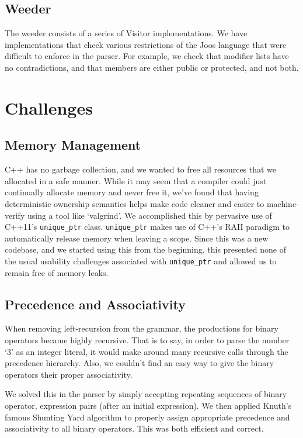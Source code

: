 \documentclass[12pt, titlepage]{article}
\begin{document}
\subsection{Weeder}
The weeder consists of a series of Visitor implementations. We have
implementations that check various restrictions of the Joos language that were
difficult to enforce in the parser. For example, we check that modifier lists
have no contradictions, and that members are either public or protected, and
not both.

\newpage

\section{Challenges}
\subsection{Memory Management}
C++ has no garbage collection, and we wanted to free all resources that we
allocated in a safe manner. While it may seem that a compiler could just
continually allocate memory and never free it, we've found that having
deterministic ownership semantics helps make code cleaner and easier to
machine-verify using a tool like `valgrind'. We accomplished this by pervasive
use of C++11's \verb+unique_ptr+ class. \verb+unique_ptr+ makes use of C++'s
RAII paradigm to automatically release memory when leaving a scope. Since this
was a new codebase, and we started using this from the beginning, this
presented none of the usual usability challenges associated with
\verb+unique_ptr+ and allowed us to remain free of memory leaks.

\subsection{Precedence and Associativity}
When removing left-recursion from the grammar, the productions for binary
operators became highly recursive. That is to say, in order to parse the number
`3' as an integer literal, it would make around many recursive calls through
the precedence hierarchy. Also, we couldn't find an easy way to give the binary
operators their proper associativity.

We solved this in the parser by simply accepting repeating sequences of binary
operator, expression pairs (after an initial expression). We then applied
Knuth's famous Shunting Yard algorithm to properly assign appropriate
precedence and associativity to all binary operators. This was both efficient
and correct.
\end{document}
